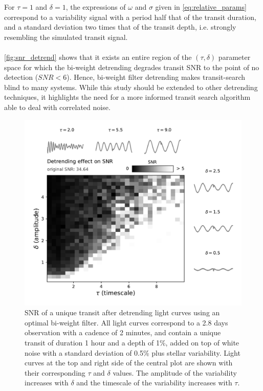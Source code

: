 \documentclass{aastex631}
\begin{document}
For $\tau=1$ and $\delta=1$, the expressions of $\omega$ and $\sigma$ given in \autoref{eq:relative_params} correspond to a variability signal with a period half that of the transit duration, and a standard deviation two times that of the transit depth, i.e. strongly resembling the simulated transit signal.\\\\
\autoref{fig:snr_detrend} shows that it exists an entire region of the $(\tau, \delta)$ parameter space for which the bi-weight detrending degrades transit SNR to the point of no detection ($SNR < 6$). Hence, bi-weight filter detrending makes transit-search blind to many systems. While this study should be extended to other detrending techniques, it highlights the need for a more informed transit search algorithm able to deal with correlated noise.


\begin{figure}[H]
    \begin{centering}
        \includegraphics[width=0.7\linewidth]{../workflows/cleaning_snr/figures/result.pdf}
        \caption{SNR of a unique transit after detrending light curves using an optimal bi-weight filter. All light curves correspond to a 2.8 days observation with a cadence of 2 minutes, and contain a unique transit of duration 1 hour and a depth of 1\%, added on top of white noise with a standard deviation of 0.5\% plus stellar variability. Light curves at the top and right side of the central plot are shown with their corresponding $\tau$ and $\delta$ values. The amplitude of the variability increases with $\delta$ and the timescale of the variability increases with $\tau$.}
        \label{fig:snr_detrend}
    \end{centering}
\end{figure}
\end{document}
